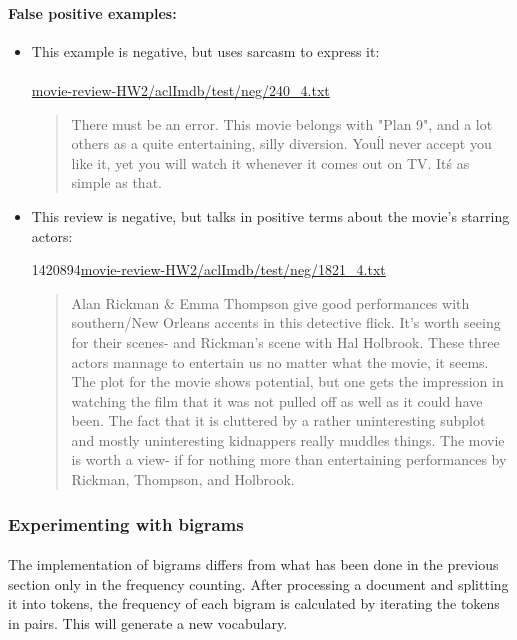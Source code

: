 \documentclass{article}
\begin{document}
\paragraph{False positive examples:}

\begin{itemize}
\item This example is negative, but uses sarcasm to express it:

    \paragraph{} \url{movie-review-HW2/aclImdb/test/neg/240_4.txt}

    \begin{quotation}
    There must be an error. This movie belongs with "Plan 9", and a lot others as a quite entertaining, silly diversion. You\'ll never accept you like it, yet you will watch it whenever it comes out on TV. It\'s as simple as that.
    \end{quotation}

\item This review is negative, but talks in positive terms about the movie's starring actors:

1420894\url{movie-review-HW2/aclImdb/test/neg/1821_4.txt}

    \begin{quotation}
    Alan Rickman \& Emma Thompson give good performances with southern/New Orleans accents in this detective flick. It's worth seeing for their scenes- and Rickman's scene with Hal Holbrook. These three actors mannage to entertain us no matter what the movie, it seems. The plot for the movie shows potential, but one gets the impression in watching the film that it was not pulled off as well as it could have been. The fact that it is cluttered by a rather uninteresting subplot and mostly uninteresting kidnappers really muddles things. The movie is worth a view- if for nothing more than entertaining performances by Rickman, Thompson, and Holbrook.
    \end{quotation} 
\end{itemize}

\subsubsection*{Experimenting with bigrams}

\paragraph{} The implementation of bigrams differs from what has been done in the previous section only in the frequency counting. After processing a document and splitting it into tokens, the frequency of each bigram is calculated by iterating the tokens in pairs. This will generate a new vocabulary.
\end{document}

